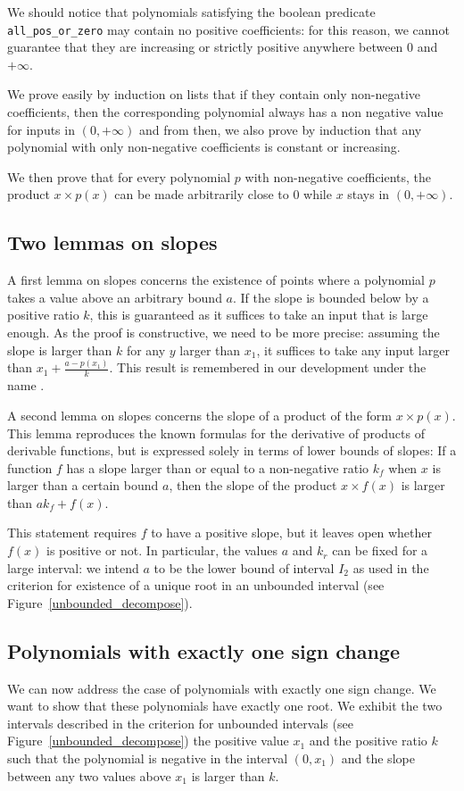 \documentclass{mscs}
\begin{document}
We should notice that polynomials satisfying the boolean predicate
{\tt all\_pos\_or\_zero} may contain no positive coefficients: for this
reason, we cannot guarantee that they are increasing or strictly positive
anywhere between 0 and \(+\infty\).

We prove easily by induction on lists that if they contain only non-negative
coefficients, then the corresponding polynomial always has a non negative value
for inputs in \((0,+\infty)\) and from then, we also prove by induction that
any polynomial with only non-negative coefficients is constant or increasing.

We then prove that for every polynomial \(p\)  with non-negative coefficients,
the product \(x \times p(x)\) can be made arbitrarily close to 0 while
$x$ stays in \((0,+\infty)\).

\subsection{Two lemmas on slopes}
A first lemma on slopes concerns the existence of points where a
polynomial \(p\) takes a value above an arbitrary bound \(a\).  If the slope
is bounded below by a positive ratio \(k\), this is guaranteed as it
suffices to take an input that is large enough.  As the proof is
constructive, we need to be more precise: assuming the slope is larger
than \(k\) for any \(y\) larger than \(x_1\), it suffices to take any
input larger than \(x_1 + \frac{a - p(x_1)}{k}\).  This result is
remembered in our development under the name .

A second lemma on slopes concerns the slope of a product of the form
\(x \times p(x)\).  This
lemma reproduces the known formulas for the derivative of products of derivable
functions, but is expressed solely in terms of lower bounds of slopes:
 If  a function \(f\) has a slope larger than or equal to a non-negative
ratio \(k_f\) when \(x\) is larger than a certain bound \(a\), 
then the slope of the product \(x \times f(x)\) is larger than
\(a k_f + f(x)\).

This statement requires \(f\) to have a positive slope, but it leaves open
whether \(f(x)\) is positive or not.  In particular, the values \(a\) and
\(k_r\) can be fixed for a large interval: we intend \(a\) to be the lower
bound of interval \(I_2\) as used in the criterion for existence of a unique
root in an unbounded interval (see Figure~\ref{unbounded_decompose}).

\subsection{Polynomials with exactly one sign change}
We can now address the case of polynomials with exactly one sign
change.  We want
to show that these polynomials have exactly one root.  We exhibit the
two intervals described in the criterion for unbounded intervals (see
Figure~\ref{unbounded_decompose}) the positive value \(x_1\) and the
positive ratio \(k\) such that the polynomial is negative in the
interval \((0, x_1)\) and the slope between any two values above
\(x_1\) is larger than \(k\).
\end{document}
